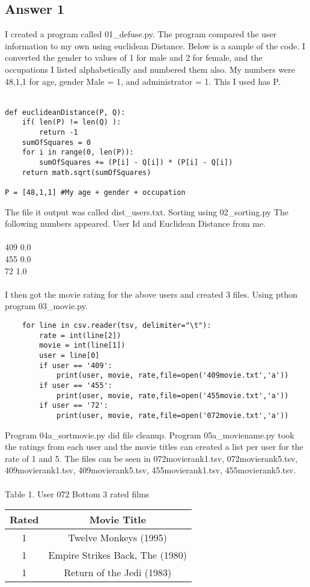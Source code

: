 \documentclass[10pt,letterpaper]{article}
\begin{document}
\subsection{Answer 1}
I created a program called 01\_defuse.py.  The program compared the user information to my own using euclidean Distance.  Below is a sample of the code.  I converted the gender to values of 1 for male and 2 for female, and the occupations I listed alphabetically and numbered them also.  My numbers were 48,1,1 for age, gender Male = 1, and administrator = 1.  This I used has P.\\
\\
\begin{lstlisting}
def euclideanDistance(P, Q):
	if( len(P) != len(Q) ):
		return -1
	sumOfSquares = 0
	for i in range(0, len(P)):
		sumOfSquares += (P[i] - Q[i]) * (P[i] - Q[i])
	return math.sqrt(sumOfSquares)

P = [48,1,1] #My age + gender + occupation
\end{lstlisting}

The file it output was called dist\_users.txt.  Sorting using 02\_sorting.py The following numbers appeared.  User Id and Euclidean Distance from me.\\ 
\\
409 0.0\\
455 0.0\\
72  1.0\\
\\
I then got the movie rating for the above users and created 3 files. Using pthon program 03\_movie.py. 
\begin{lstlisting}
	for line in csv.reader(tsv, delimiter="\t"):
		rate = int(line[2])
		movie = int(line[1])
		user = line[0]
		if user == '409':
			print(user, movie, rate,file=open('409movie.txt','a'))
		if user == '455':
			print(user, movie, rate,file=open('455movie.txt','a'))
		if user == '72':
			print(user, movie, rate,file=open('072movie.txt','a'))
\end{lstlisting}
Program 04a\_sortmovie.py did file cleanup.  Program 05a\_moviename.py took the ratings from each user and the movie titles can created a list per user for the rate of 1 and 5.  The files can be seen in 072movierank1.tsv, 072movierank5.tsv, 409movierank1.tsv, 409movierank5.tsv, 455movierank1.tsv, 455movierank5.tsv.\\ 
\\
Table 1. User 072 Bottom 3 rated films\\
\begin{center}
  \begin{tabular}{ | c | c }
    \hline
     Rated & Movie Title\\ \hline
     1 & Twelve Monkeys (1995)\\ \hline
     1 & Empire Strikes Back, The (1980)\\ \hline 
     1 & Return of the Jedi (1983)\\ \hline
    \hline
  \end{tabular}
\end{center}
\end{document}
